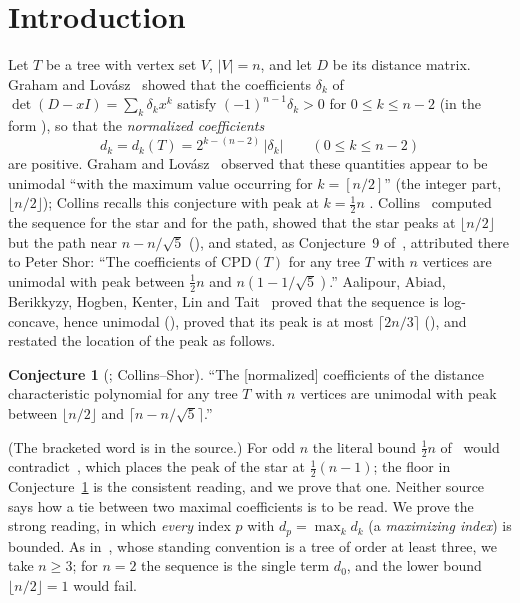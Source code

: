 \documentclass[11pt]{amsart}
\theoremstyle{definition}
\newtheorem{conjecture}[theorem]{Conjecture}
\theoremstyle{remark}
\begin{document}
\tableofcontents

\section{Introduction}\label{sec:intro}

Let $T$ be a tree with vertex set $V$, $|V|=n$, and let $D$ be its distance
matrix. Graham and Lov\'asz~\cite{GL78} showed that the coefficients
$\delta_k$ of $\det(D-xI)=\sum_k\delta_kx^k$ satisfy
$(-1)^{n-1}\delta_k>0$ for $0\le k\le n-2$ (in the form
\cite[Fact~1.1]{AAB}), so that the \emph{normalized coefficients}
\[
d_k=d_k(T)=2^{k-(n-2)}\,|\delta_k|\qquad(0\le k\le n-2)
\]
are positive. Graham and Lov\'asz~\cite[p.~83]{GL78} observed that these
quantities appear to be unimodal ``with the maximum value occurring for
$k=[n/2]$'' (the integer part, $\lfloor n/2\rfloor$); Collins recalls this
conjecture with peak at $k=\tfrac12n$ \cite[p.~29]{Col89}. Collins~\cite{Col89} computed the sequence for the star and for
the path, showed that the star peaks at $\lfloor n/2\rfloor$ but the path
near $n-n/\sqrt5$ (\cite[Theorems~1 and~3]{Col89}), and stated, as
Conjecture~9 of~\cite{Col89}, attributed there to Peter Shor: ``The
coefficients of $\mathrm{CPD}(T)$ for any tree $T$ with $n$ vertices are
unimodal with peak between $\tfrac12n$ and $n(1-1/\sqrt5)$.'' Aalipour,
Abiad, Berikkyzy, Hogben, Kenter, Lin and Tait~\cite{AAB} proved that the
sequence is log-concave, hence unimodal (\cite[Theorem~2.1]{AAB}), proved that
its peak is at most $\lceil 2n/3\rceil$ (\cite[Theorem~3.3]{AAB}), and
restated the location of the peak as follows.

\begin{conjecture}[{\cite[Conjecture~1.2]{AAB}}; Collins--Shor]\label{conj:CS}
``The [normalized] coefficients of the distance characteristic polynomial for
any tree $T$ with $n$ vertices are unimodal with peak between
$\lfloor n/2\rfloor$ and $\lceil n-n/\sqrt5\rceil$.''
\end{conjecture}

(The bracketed word is in the source.) For odd $n$ the literal bound
$\tfrac12n$ of~\cite{Col89} would contradict~\cite[Theorem~1]{Col89}, which
places the peak of the star at $\tfrac12(n-1)$; the floor in
Conjecture~\ref{conj:CS} is the consistent reading, and we prove that one.
Neither source says how a tie between two maximal coefficients is to be read.
We prove the strong reading, in which \emph{every} index $p$ with
$d_p=\max_kd_k$ (a \emph{maximizing index}) is bounded. As in~\cite{AAB},
whose standing convention is a tree of order at least three, we take
$n\ge3$; for $n=2$ the sequence is the single term $d_0$, and the lower
bound $\lfloor n/2\rfloor=1$ would fail.
\end{document}
